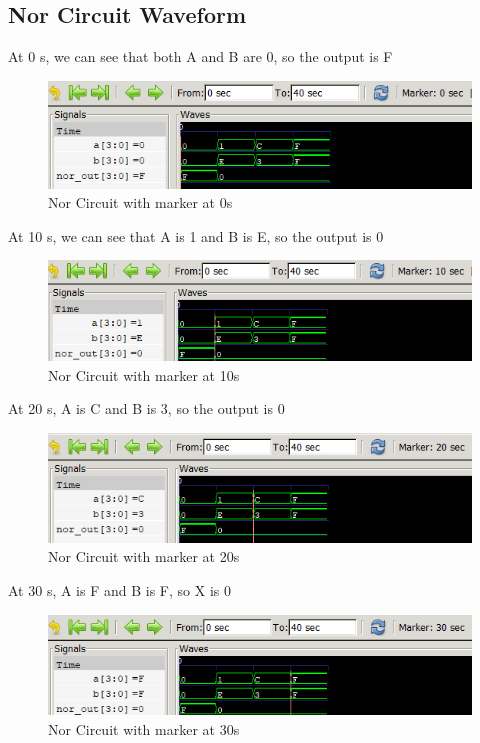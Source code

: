 \documentclass[12pt]{article}
\begin{document}
\subsection{Nor Circuit Waveform}

At 0 s, we can see that both A and B are 0, so the output is F
\begin{figure}[h]
    \centering
    \includegraphics[width = 1.0\textwidth]{figs/Nor0.png}
    \caption{Nor Circuit with marker at 0s}
    \label{fig:enter-label}
\end{figure}


At 10 s, we can see that A is 1 and B is E, so the output is 0
\begin{figure}[h]
    \centering
    \includegraphics[width = 1.0\textwidth]{figs/Nor10.png}
    \caption{Nor Circuit with marker at 10s}
    \label{fig:enter-label}
\end{figure}

At 20 s, A is C and B is 3, so the output is 0
\begin{figure}[h]
    \centering
    \includegraphics[width = 1.0\textwidth]{figs/Nor20.png}
    \caption{Nor Circuit with marker at 20s}
    \label{fig:enter-label}
\end{figure}

\newpage

At 30 s, A is F and B is F, so X is 0
\begin{figure}[h]
    \centering
    \includegraphics[width = 1.0\textwidth]{figs/Nor30.png}
    \caption{Nor Circuit with marker at 30s}
    \label{fig:enter-label}
\end{figure}
\end{document}
